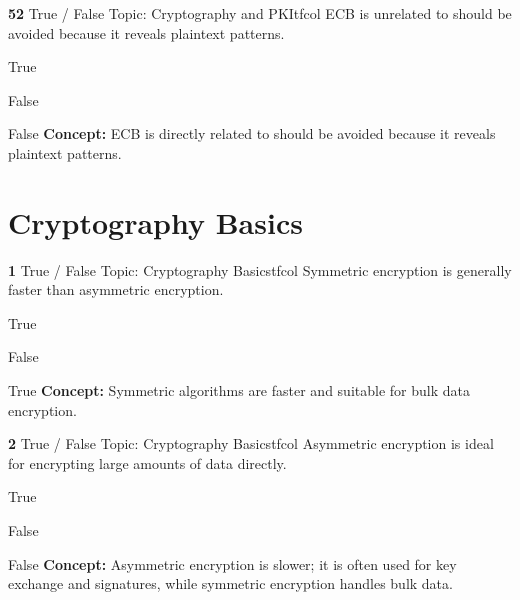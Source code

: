 \documentclass[10pt,a4paper]{article}
\begin{document}
\begin{qcard}{\color{white}\textbf{52} \hfill \small True / False \textbar{} Topic: Cryptography and PKI}{tfcol}
ECB is unrelated to should be avoided because it reveals plaintext patterns.

\begin{qoptions}
\item True
\item False
\end{qoptions}
\begin{explainbox}{False}
\textbf{Concept:} ECB is directly related to should be avoided because it reveals plaintext patterns.
\end{explainbox}
\end{qcard}

\section{Cryptography Basics}
\begin{qcard}{\color{white}\textbf{1} \hfill \small True / False \textbar{} Topic: Cryptography Basics}{tfcol}
Symmetric encryption is generally faster than asymmetric encryption.

\begin{qoptions}
\item True
\item False
\end{qoptions}
\begin{explainbox}{True}
\textbf{Concept:} Symmetric algorithms are faster and suitable for bulk data encryption.
\end{explainbox}
\end{qcard}

\begin{qcard}{\color{white}\textbf{2} \hfill \small True / False \textbar{} Topic: Cryptography Basics}{tfcol}
Asymmetric encryption is ideal for encrypting large amounts of data directly.

\begin{qoptions}
\item True
\item False
\end{qoptions}
\begin{explainbox}{False}
\textbf{Concept:} Asymmetric encryption is slower; it is often used for key exchange and signatures, while symmetric encryption handles bulk data.
\end{explainbox}
\end{qcard}
\end{document}
